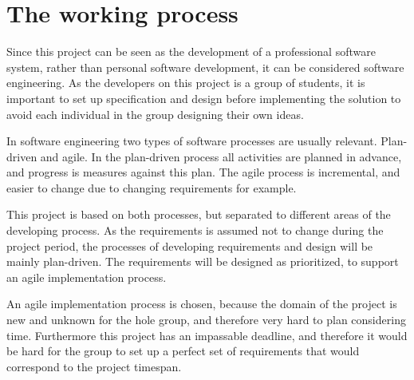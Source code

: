 \chapter{The working process}
Since this project can be seen as the development of a professional software system, rather than personal software development, it can be considered software engineering. As the developers on this project is a group of students, it is important to set up specification and design before implementing the solution to avoid each individual in the group designing their own ideas.

In software engineering two types of software processes are usually relevant. Plan-driven and agile. In the plan-driven process all activities are planned in advance, and progress is measures against this plan. The agile process is incremental, and easier to change due to changing requirements for example.

This project is based on both processes, but separated to different areas of the developing process. As the requirements is assumed not to change during the project period, the processes of developing requirements and design will be mainly plan-driven. The requirements will be designed as prioritized, to support an agile implementation process.

An agile implementation process is chosen, because the domain of the project is new and unknown for the hole group, and therefore very hard to plan considering time. Furthermore this project has an impassable deadline, and therefore it would be hard for the group to set up a perfect set of requirements that would correspond to the project timespan.